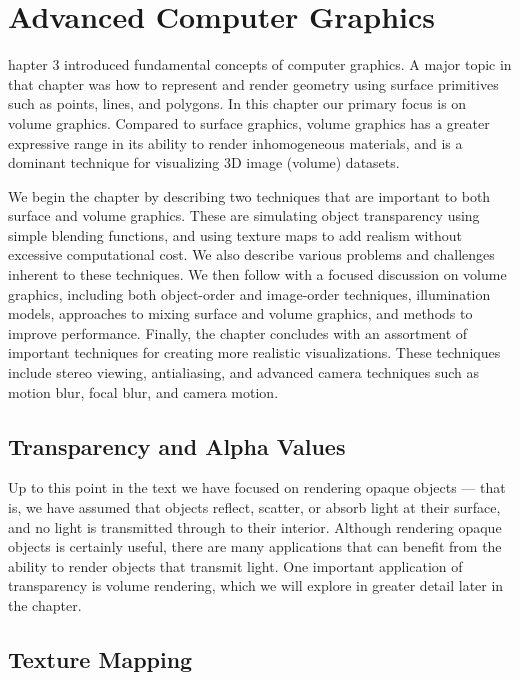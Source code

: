 \chapter{Advanced Computer Graphics}
\label{chap:acg}

hapter 3 introduced fundamental concepts of computer graphics.
A major topic in that chapter was how to represent and render geometry using surface primitives such as points, lines, and polygons.
In this chapter our primary focus is on volume graphics.
Compared to surface graphics, volume graphics has a greater expressive range in its ability to render inhomogeneous materials, and is a dominant technique for visualizing 3D image (volume) datasets.

We begin the chapter by describing two techniques that are important to both surface and volume graphics.
These are simulating object transparency using simple blending functions, and using texture maps to add realism without excessive computational cost.
We also describe various problems and challenges inherent to these techniques.
We then follow with a focused discussion on volume graphics, including both object-order and image-order techniques, illumination models, approaches to mixing surface and volume graphics, and methods to improve performance.
Finally, the chapter concludes with an assortment of important techniques for creating more realistic visualizations.
These techniques include stereo viewing, antialiasing, and advanced camera techniques such as motion blur, focal blur, and camera motion.

\section{Transparency and Alpha Values}

Up to this point in the text we have focused on rendering opaque objects — that is, we have assumed that objects reflect, scatter, or absorb light at their surface, and no light is transmitted through to their interior. Although rendering opaque objects is certainly useful, there are many applications that can benefit from the ability to render objects that transmit light. One important
application of transparency is volume rendering, which we will explore in greater detail later in the
chapter.

\section{Texture Mapping}

